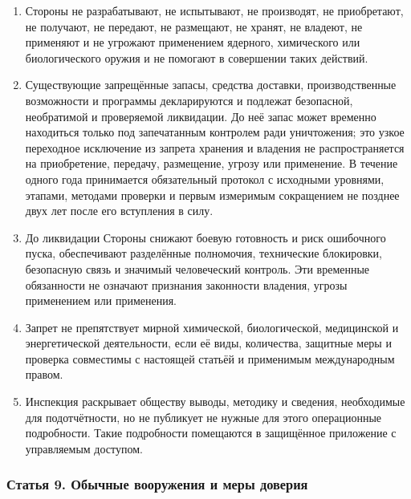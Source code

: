 \documentclass[
  russian,
  11pt,
  a4paper,
]{article}
\providecommand{\tightlist}{%
  \setlength{\itemsep}{0pt}\setlength{\parskip}{0pt}}
\begin{document}
\begin{enumerate}
\def\labelenumi{\arabic{enumi}.}
\tightlist
\item
  Стороны не разрабатывают, не испытывают, не производят, не
  приобретают, не получают, не передают, не размещают, не хранят, не
  владеют, не применяют и не угрожают применением ядерного, химического
  или биологического оружия и не помогают в совершении таких действий.
\item
  Существующие запрещённые запасы, средства доставки, производственные
  возможности и программы декларируются и подлежат безопасной,
  необратимой и проверяемой ликвидации. До неё запас может временно
  находиться только под запечатанным контролем ради уничтожения; это
  узкое переходное исключение из запрета хранения и владения не
  распространяется на приобретение, передачу, размещение, угрозу или
  применение. В течение одного года принимается обязательный протокол с
  исходными уровнями, этапами, методами проверки и первым измеримым
  сокращением не позднее двух лет после его вступления в силу.
\item
  До ликвидации Стороны снижают боевую готовность и риск ошибочного
  пуска, обеспечивают разделённые полномочия, технические блокировки,
  безопасную связь и значимый человеческий контроль. Эти временные
  обязанности не означают признания законности владения, угрозы
  применением или применения.
\item
  Запрет не препятствует мирной химической, биологической, медицинской и
  энергетической деятельности, если её виды, количества, защитные меры и
  проверка совместимы с настоящей статьёй и применимым международным
  правом.
\item
  Инспекция раскрывает обществу выводы, методику и сведения, необходимые
  для подотчётности, но не публикует не нужные для этого операционные
  подробности. Такие подробности помещаются в защищённое приложение с
  управляемым доступом.
\end{enumerate}

\subsubsection{Статья 9. Обычные вооружения и меры
доверия}\label{ux441ux442ux430ux442ux44cux44f-9-ux43eux431ux44bux447ux43dux44bux435-ux432ux43eux43eux440ux443ux436ux435ux43dux438ux44f-ux438-ux43cux435ux440ux44b-ux434ux43eux432ux435ux440ux438ux44f}
\end{document}
